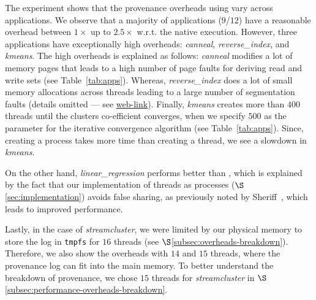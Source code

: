 The experiment shows that the provenance overheads using \projecttitle vary across applications. 
We observe that a majority of applications ($9$/$12$) have a reasonable overhead between $1\times$ up to $2.5\times$ w.r.t. the native execution. However, three applications have exceptionally high overheads:  {\em canneal}, {\em reverse\_index}, and {\em kmeans}. The high overheads is explained as follows: {\em canneal} modifies a lot of memory pages that leads to a high number of page faults for deriving read and write sets (see Table~\ref{tab:apps}). Whereas, {\em reverse\_index} does a lot of small memory allocations across threads leading to a large number of segmentation faults %
(details omitted --- see  \href{https://mic92.github.io/inspector/index.html\#measurement_table}{web-link}).  Finally, {\em kmeans} creates more than $400$ threads until the clusters co-efficient converges, when we specify $500$ as the parameter for the iterative convergence algorithm (see Table~\ref{tab:apps}). Since, creating a process takes more time than creating a thread, we see a slowdown in {\em kmeans}.


On the other hand, {\em linear\_regression} performs better than \pthreads, which is explained by the fact that our implementation of threads as processes ($\S$\ref{sec:implementation})  avoids false sharing, as previously noted by Sheriff~\cite{false-sharing-sheriff}, which leads to improved performance. %



Lastly, in the case of {\em streamcluster}, we were limited by our physical memory to store the log in {\tt tmpfs} for $16$ threads (see $\S$\ref{subsec:overheads-breakdown}). Therefore, we also show the overheads with $14$ and $15$ threads,  where the provenance log can fit into the main memory.  To better understand the breakdown of provenance, we chose $15$ threads for {\em streamcluster} in $\S$\ref{subsec:performance-overheads-breakdown}.



%

